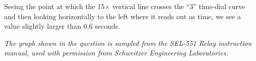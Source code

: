 \vskip 10pt

Seeing the point at which the 15$\times$ vertical line crosses the ``3'' time-dial curve and then looking horizontally to the left where it reads out as time, we see a value slightly larger than 0.6 seconds.

\vskip 10pt

\noindent
{\it The graph shown in the question is sampled from the SEL-551 Relay instruction manual, used with permission from Schweitzer Engineering Laboratories.}











